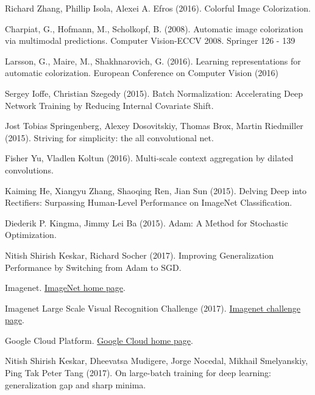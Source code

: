 \documentclass[twoside,twocolumn]{article}
\begin{document}
\begin{thebibliography}{99} %

Richard Zhang, Phillip Isola, Alexei A. Efros (2016).
\newblock Colorful Image Colorization.
 
Charpiat, G., Hofmann, M., Scholkopf, B. (2008).
\newblock Automatic image colorization via multimodal
predictions.
\newblock Computer Vision-ECCV 2008. Springer 126 - 139

Larsson, G., Maire, M., Shakhnarovich, G. (2016).
\newblock Learning representations for automatic
colorization.
\newblock European Conference on Computer Vision (2016)

Sergey Ioffe, Christian Szegedy (2015).
\newblock Batch Normalization: Accelerating Deep Network Training by Reducing Internal Covariate Shift.

Jost Tobias Springenberg, Alexey Dosovitskiy, Thomas Brox, Martin Riedmiller (2015).
\newblock Striving for simplicity: the all convolutional net.

Fisher Yu, Vladlen Koltun (2016).
\newblock Multi-scale context aggregation by dilated convolutions.

Kaiming He, Xiangyu Zhang, Shaoqing Ren, Jian Sun (2015).
\newblock Delving Deep into Rectifiers: Surpassing Human-Level Performance on ImageNet Classification.

Diederik P. Kingma, Jimmy Lei Ba (2015).
\newblock Adam: A Method for Stochastic Optimization.

Nitish Shirish Keskar, Richard Socher (2017).
\newblock Improving Generalization Performance by Switching from Adam to SGD.

Imagenet.
\newblock \href{http://www.image-net.org/index}{ImageNet home page}.

Imagenet Large Scale Visual Recognition Challenge (2017).
\newblock \href{http://www.image-net.org/challenges/LSVRC/}{Imagenet challenge page}.

Google Cloud Platform.
\newblock \href{https://cloud.google.com/}{Google Cloud home page}.

Nitish Shirish Keskar, Dheevatsa Mudigere, Jorge Nocedal, Mikhail Smelyanskiy, Ping Tak Peter Tang (2017). 
\newblock On large-batch training for deep learning: generalization gap and sharp minima.


\end{thebibliography}
\end{document}
